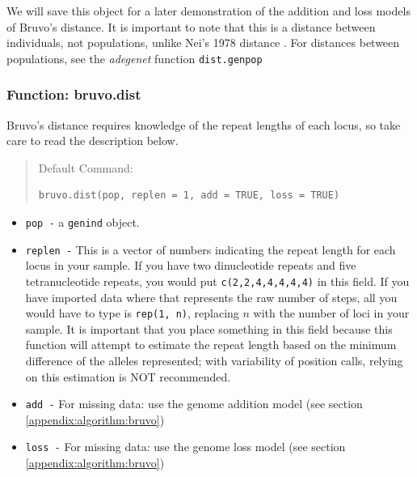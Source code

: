 \documentclass[letterpaper]{article}\usepackage[]{graphicx}\usepackage[]{color}
\makeatletter
\newenvironment{kframe}{%
 \def\at@end@of@kframe{}%
 \ifinner\ifhmode%
  \def\at@end@of@kframe{\end{minipage}}%
  \begin{minipage}{\columnwidth}%
 \fi\fi%
 \def\FrameCommand##1{\hskip\@totalleftmargin \hskip-\fboxsep
 \colorbox{shadecolor}{##1}\hskip-\fboxsep
     \hskip-\linewidth \hskip-\@totalleftmargin \hskip\columnwidth}%
 \MakeFramed {\advance\hsize-\width
   \@totalleftmargin\z@ \linewidth\hsize
   \@setminipage}}%
 {\par\unskip\endMakeFramed%
 \at@end@of@kframe}
\newenvironment{knitrout}{}{} %
\newcommand{\tab}{\hspace*{1em}}
\makeatother
\begin{document}
We will save this object for a later demonstration of the addition and loss models of Bruvo's distance. It is important to note that this is a distance between individuals, not populations, unlike Nei's 1978 distance \cite{Nei:1978}. For distances between populations, see the \textit{adegenet} function \texttt{dist.genpop}

\subsubsection{Function: bruvo.dist}\label{index:bruvo:bruvo.dist}

\tab\tab Bruvo's distance requires knowledge of the repeat lengths of each locus, so take care to read the description below.
\begin{quote}
Default Command:
\begin{knitrout}
\color{fgcolor}\begin{kframe}
\begin{verbatim}
bruvo.dist(pop, replen = 1, add = TRUE, loss = TRUE)
\end{verbatim}
\end{kframe}
\end{knitrout}

\end{quote}
\begin{itemize}
  \item \texttt{pop -} a \texttt{genind} object.
  \item \texttt{replen -} This is a vector of numbers indicating the repeat length for each locus in your sample. If you have two dinucleotide repeats and five tetranucleotide repeats, you would put \texttt{c(2,2,4,4,4,4,4)} in this field. If you have imported data where that represents the raw number of steps, all you would have to type is \texttt{rep(1, n)}, replacing $n$ with the number of loci in your sample. It is important that you place something in this field because this function will attempt to estimate the repeat length based on the minimum difference of the alleles represented; with variability of position calls, relying on this estimation is NOT recommended. 
  \item \texttt{add -} For missing data: use the genome addition model (see section \ref{appendix:algorithm:bruvo})
  \item \texttt{loss -} For missing data: use the genome loss model (see section \ref{appendix:algorithm:bruvo})
\end{itemize}
\end{document}
